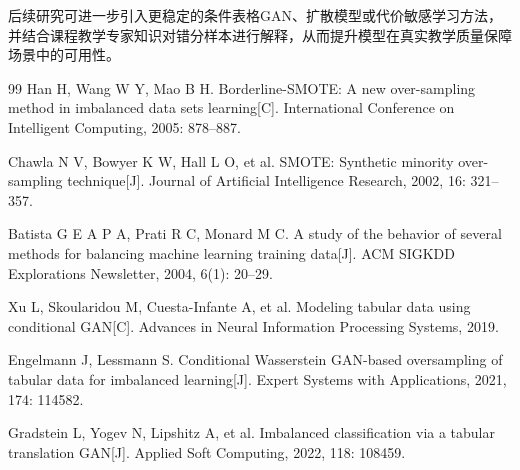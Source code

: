 \documentclass[UTF8,a4paper,12pt,fontset=fandol]{ctexart}
\begin{document}
后续研究可进一步引入更稳定的条件表格GAN、扩散模型或代价敏感学习方法，并结合课程教学专家知识对错分样本进行解释，从而提升模型在真实教学质量保障场景中的可用性。

\begin{thebibliography}{99}
Han H, Wang W Y, Mao B H. Borderline-SMOTE: A new over-sampling method in imbalanced data sets learning[C]. International Conference on Intelligent Computing, 2005: 878--887.

Chawla N V, Bowyer K W, Hall L O, et al. SMOTE: Synthetic minority over-sampling technique[J]. Journal of Artificial Intelligence Research, 2002, 16: 321--357.

Batista G E A P A, Prati R C, Monard M C. A study of the behavior of several methods for balancing machine learning training data[J]. ACM SIGKDD Explorations Newsletter, 2004, 6(1): 20--29.

Xu L, Skoularidou M, Cuesta-Infante A, et al. Modeling tabular data using conditional GAN[C]. Advances in Neural Information Processing Systems, 2019.

Engelmann J, Lessmann S. Conditional Wasserstein GAN-based oversampling of tabular data for imbalanced learning[J]. Expert Systems with Applications, 2021, 174: 114582.

Gradstein L, Yogev N, Lipshitz A, et al. Imbalanced classification via a tabular translation GAN[J]. Applied Soft Computing, 2022, 118: 108459.
\end{thebibliography}
\end{document}
